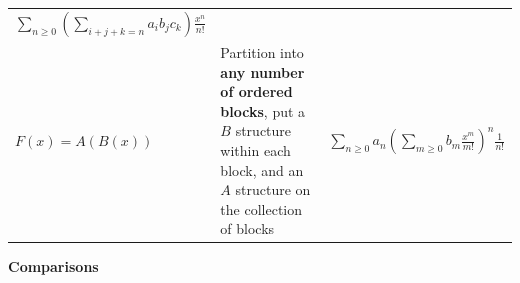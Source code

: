\begin{longtable}[]{@{}lll@{}}
\begin{minipage}[t]{0.30\columnwidth}
\(\displaystyle\sum_{n\geq 0} \left( \displaystyle\sum_{i+j+k=n} a_i b_j c_k\right) \frac{x^n}{n!}\)\strut
\end{minipage}\tabularnewline
\begin{minipage}[t]{0.30\columnwidth}\raggedright
\(F(x) = A(B(x))\)\strut
\end{minipage} & \begin{minipage}[t]{0.30\columnwidth}\raggedright
Partition into \textbf{any number of ordered blocks}, put a \(B\)
structure within each block, and an \(A\) structure on the collection of
blocks\strut
\end{minipage} & \begin{minipage}[t]{0.30\columnwidth}\raggedright
\(\displaystyle\sum_{n\geq 0} a_n {\left( \displaystyle\sum_{m\geq 0} b_m \frac{x^m}{m!}\right)^n}\frac{1}{n!}\)\strut
\end{minipage}\tabularnewline
\bottomrule
\end{longtable}

\textbf{Comparisons}


